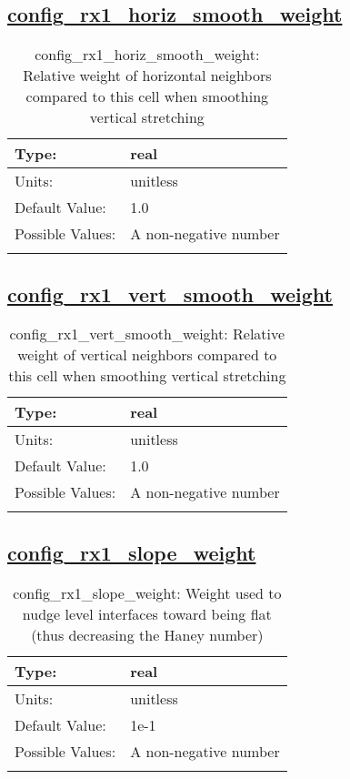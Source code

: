 \subsection[config\_rx1\_horiz\_smooth\_weight]{\hyperref[sec:nm_tab_constrain_Haney_number]{config\_rx1\_horiz\_smooth\_weight}}
\label{subsec:nm_sec_config_rx1_horiz_smooth_weight}
\begin{center}
\begin{longtable}{| p{2.0in} || p{4.0in} |}
    \hline
    Type: & real \\
    \hline
    Units: & \si{unitless} \\
    \hline
    Default Value: & 1.0 \\
    \hline
    Possible Values: & A non-negative number \\
    \hline
    \caption{config\_rx1\_horiz\_smooth\_weight: Relative weight of horizontal neighbors compared to this cell when smoothing vertical stretching}
\end{longtable}
\end{center}
\subsection[config\_rx1\_vert\_smooth\_weight]{\hyperref[sec:nm_tab_constrain_Haney_number]{config\_rx1\_vert\_smooth\_weight}}
\label{subsec:nm_sec_config_rx1_vert_smooth_weight}
\begin{center}
\begin{longtable}{| p{2.0in} || p{4.0in} |}
    \hline
    Type: & real \\
    \hline
    Units: & \si{unitless} \\
    \hline
    Default Value: & 1.0 \\
    \hline
    Possible Values: & A non-negative number \\
    \hline
    \caption{config\_rx1\_vert\_smooth\_weight: Relative weight of vertical neighbors compared to this cell when smoothing vertical stretching}
\end{longtable}
\end{center}
\subsection[config\_rx1\_slope\_weight]{\hyperref[sec:nm_tab_constrain_Haney_number]{config\_rx1\_slope\_weight}}
\label{subsec:nm_sec_config_rx1_slope_weight}
\begin{center}
\begin{longtable}{| p{2.0in} || p{4.0in} |}
    \hline
    Type: & real \\
    \hline
    Units: & \si{unitless} \\
    \hline
    Default Value: & 1e-1 \\
    \hline
    Possible Values: & A non-negative number \\
    \hline
    \caption{config\_rx1\_slope\_weight: Weight used to nudge level interfaces toward being flat (thus decreasing the Haney number)}
\end{longtable}
\end{center}
